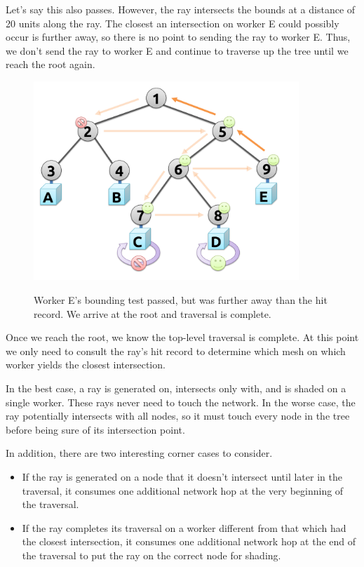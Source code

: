 \documentclass[12pt]{ucthesis}
\newcommand{\captionfonts}{\small\bf\ssp}
\begin{document}
Let's say this also passes. However, the ray intersects the bounds at a distance
of 20 units along the ray. The closest an intersection on worker E could
possibly occur is further away, so there is no point to sending the ray to
worker E. Thus, we don't send the ray to worker E and continue to traverse up
the tree until we reach the root again.

\begin{figure}[H]
    \centering
    \includegraphics[width=100mm]{figures/traversal7.pdf}
    \captionfonts
    \caption{Worker E's bounding test passed, but was further away than the hit record. We arrive at the root and traversal is complete.}
    \label{fig:traversal7}
\end{figure}

Once we reach the root, we know the top-level traversal is complete. At this
point we only need to consult the ray's hit record to determine which mesh on
which worker yields the closest intersection.

In the best case, a ray is generated on, intersects only with, and is shaded on
a single worker. These rays never need to touch the network. In the worse case,
the ray potentially intersects with all nodes, so it must touch every node in
the tree before being sure of its intersection point.

In addition, there are two interesting corner cases to consider.

\begin{itemize}
    \item If the ray is generated on a node that it doesn't intersect until
        later in the traversal, it consumes one additional network hop at the
        very beginning of the traversal.
    \item If the ray completes its traversal on a worker different from that
        which had the closest intersection, it consumes one additional network hop
        at the end of the traversal to put the ray on the correct node for
        shading.
\end{itemize}
\end{document}
